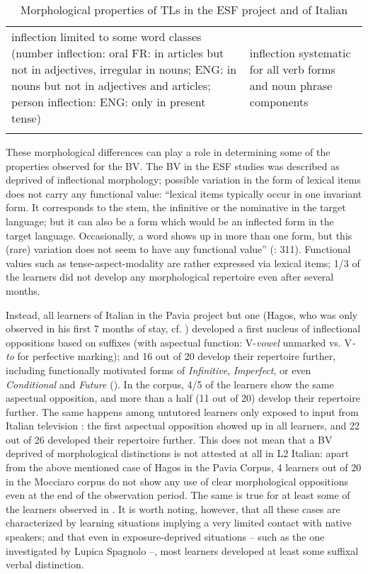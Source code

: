 \documentclass[output=paper]{langscibook}
\begin{document}
\begin{table}
\begin{tabularx}{\textwidth}{QQ}
inflection limited to some word classes (number inflection: oral FR: in articles but not in adjectives, irregular in nouns; ENG: in nouns but not in adjectives and articles; person inflection: ENG: only in present tense) & inflection systematic for all verb forms and noun phrase components\\
\lspbottomrule
\end{tabularx}
\caption{\label{tab:benazzo:5}Morphological properties of TLs in the ESF project and of Italian}
\end{table}

These morphological differences can play a role in determining some of the properties observed for the BV. The BV in the ESF studies was described as deprived of inflectional morphology; possible variation in the form of lexical items does not carry any functional value: “lexical items typically occur in one invariant form. It corresponds to the stem, the infinitive or the nominative in the target language; but it can also be a form which would be an inflected form in the target language. Occasionally, a word shows up in more than one form, but this (rare) variation does not seem to have any functional value” (\citealt{KleinPerdue1997}: 311). Functional values such as tense-aspect-modality are rather expressed via lexical items; 1/3 of the learners did not develop any morphological repertoire even after several months. 

Instead, all learners of Italian in the Pavia project but one (Hagos, who was only observed in his first 7 months of stay, cf. \citealt{BanfiBernini2003}) developed a first nucleus of inflectional oppositions based on suffixes (with aspectual function: V-\textit{vowel} unmarked vs. V\textit{{}-to} for perfective marking); and 16 out of 20 develop their repertoire further, including functionally motivated forms of \textit{Infinitive}, \textit{Imperfect}, or even \textit{Conditional} and \textit{Future} (\citealt{BanfiBernini2003}). In the \citet{Mocciaro2020} corpus, 4/5 of the learners show the same aspectual opposition, and more than a half (11 out of 20) develop their repertoire further. The same happens among untutored learners only exposed to input from Italian television \citep{Caruana2003}: the first aspectual opposition showed up in all learners, and 22 out of 26 developed their repertoire further. This does not mean that a BV deprived of morphological distinctions is not attested at all in L2 Italian: apart from the above mentioned case of Hagos in the Pavia Corpus, 4 learners out of 20 in the Mocciaro corpus do not show any use of clear morphological oppositions even at the end of the observation period. The same is true for at least some of the learners observed in \citet{LupicaSpagnoloForthcoming}. It is worth noting, however, that  all these cases are characterized by learning situations implying a very limited contact with native speakers; and that  even in exposure-deprived situations – such as the one investigated by Lupica Spagnolo –, most learners developed at least some suffixal verbal distinction.
\end{document}
